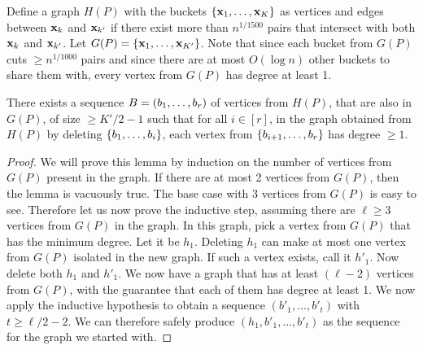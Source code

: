 Define a graph $H(P)$ with the buckets $\left\{\mathbf{x}_1,\ldots,\mathbf{x}_K\right\}$ as vertices and edges between $\mathbf{x}_k$ and $\mathbf{x}_{k'}$ if there exist more than $n^{1/1500}$ pairs that intersect with both $\mathbf{x}_{k}$ and $\mathbf{x}_{k'}$. Let $G(P) = \left\{\mathbf{x}_1,\ldots,\mathbf{x}_{K'}\right\}$. Note that since each bucket from $G(P)$ cuts $\geq n^{1/1000}$ pairs and since there are at most $O(\log n)$ other buckets to share them with, every vertex from $G(P)$ has degree at least 1.

\begin{lemma}
\label{lem:halfVerticesIndep}
There exists a sequence $B=\left(b_1,\ldots,b_r\right)$ of vertices from $H(P)$, that are also in $G(P)$, of size $\geq K'/2 - 1$ such that for all $i \in [r]$, in the graph obtained from $H(P)$ by deleting $\left\{b_1,\ldots,b_{i}\right\}$, each vertex from $\left\{b_{i+1},\ldots,b_{r}\right\}$ has degree $\geq 1$.
\end{lemma}
\begin{proof}
We will prove this lemma by induction on the number of vertices from $G(P)$ present in the graph. If there are at most 2 vertices from $G(P)$, then the lemma is vacuously true. The base case with 3 vertices from $G(P)$ is easy to see. Therefore let us now prove the inductive step, assuming there are $\ell \geq 3$ vertices from $G(P)$ in the graph. In this graph, pick a vertex from $G(P)$ that has the minimum degree. Let it be $h_1$. Deleting $h_1$ can make at most one vertex from $G(P)$ isolated in the new graph. If such a vertex exists, call it $h'_1$. Now delete both $h_1$ and $h'_1$. We now have a graph that has at least $(\ell - 2)$ vertices from $G(P)$, with the guarantee that each of them has degree at least 1. We now apply the inductive hypothesis to obtain a sequence $(b'_1,\ldots,b'_{t})$ with $t \geq \ell/2 - 2$. We can therefore safely produce $(h_1,b'_1,\ldots,b'_{t})$ as the sequence for the graph we started with.
\end{proof}

